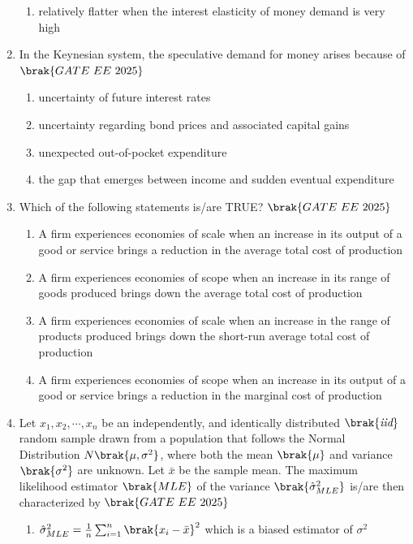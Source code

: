 \documentclass[journal,12pt,onecolumn]{IEEEtran}
\theoremstyle{remark}
\begin{document}
\begin{enumerate}
\begin{enumerate}
    \item relatively flatter when the interest elasticity of money demand is very high
    \end{enumerate}
\item In the Keynesian system, the speculative demand for money arises because of
\hfill $\brak{GATE\ EE\ 2025}$
    \begin{enumerate}
    \item uncertainty of future interest rates
    \item uncertainty regarding bond prices and associated capital gains
    \item unexpected out-of-pocket expenditure
    \item the gap that emerges between income and sudden eventual expenditure
   \end{enumerate}
\item Which of the following statements is/are TRUE?
\hfill $\brak{GATE\ EE\ 2025}$
    \begin{enumerate}
     \item A firm experiences economies of scale when an increase in its output of a good or service brings a reduction in the average total cost of production
    \item A firm experiences economies of scope when an increase in its range of goods produced brings down the average total cost of production
    \item A firm experiences economies of scale when an increase in the range of products produced brings down the short-run average total cost of production
    \item A firm experiences economies of scope when an increase in its output of a good or service brings a reduction in the marginal cost of production
   \end{enumerate}
    \item Let $x_1, x_2, \cdots, x_n$ be an independently, and identically distributed  $\brak{\textit{iid}}$ random sample drawn from a population that follows the Normal Distribution $N \brak{\mu, \sigma^2}$, where both the mean $\brak{\mu}$ and variance $ \brak{\sigma^2}$ are unknown. Let $\bar{x}$ be the sample mean. The maximum likelihood estimator  $\brak{MLE}$ of the variance $\brak{\hat{\sigma}^2_{MLE}}$ is/are then characterized by
    \hfill $\brak{GATE\ EE\ 2025}$
    \begin{enumerate}
    \item $\hat{\sigma}_{MLE}^2 = \frac{1}{n}\sum_{i=1}^{n} \brak{x_i-\bar{x}}^2$ which is a biased estimator of $\sigma^2$

\end{enumerate}
\end{enumerate}
\end{document}

